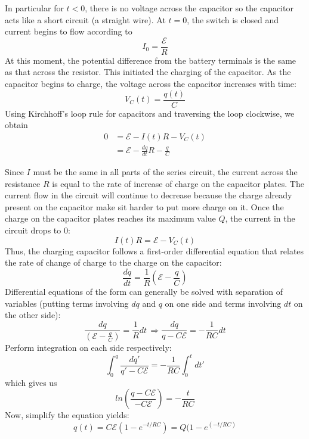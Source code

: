 \documentclass[11pt, letterpaper]{article}
\begin{document}
In particular for $t < 0$, there is no voltage across the capacitor so the capacitor acts like a short circuit (a straight wire). At $t = 0$, the switch is closed and current begins to flow according to \[I_0 = \frac{\mathcal{E}}{R}\] At this moment, the potential difference from the battery terminals is the same as that across the resistor. This initiated the charging of the capacitor. As the capacitor begins to charge, the voltage across the capacitor increases with time: \[V_C(t) = \frac{q(t)}{C}\] Using Kirchhoff's loop rule for capacitors and traversing the loop clockwise, we obtain
\begin{align*}
	0  & = \mathcal{E} - I(t)R - V_C(t)\\
		& = \mathcal{E} - \frac{dq}{dt}R - \frac{q}{C}
\end{align*}

Since $I$ must be the same in all parts of the series circuit, the current across the resistance $R$ is equal to the rate of increase of charge on the capacitor plates. The current flow in the circuit will continue to decrease because the charge already present on the capacitor make sit harder to put more charge on it. Once the charge on the capacitor plates reaches its maximum value $Q$, the current in the circuit drops to $0$: \[I(t)R = \mathcal{E} - V_C(t)\] Thus, the charging capacitor follows a first-order differential equation that relates the rate of change of charge to the charge on the capacitor: \[\frac{dq}{dt} = \frac{1}{R}\left(\mathcal{E} - \frac{q}{C}\right)\] Differential equations of the form can generally be solved with separation of variables (putting terms involving $dq$ and $q$ on one side and terms involving $dt$ on the other side): \[\frac{dq}{\left(\mathcal{E} - \frac{q}{C}\right)} = \frac{1}{R}dt \,\Rightarrow \frac{dq}{q - C\mathcal{E}} = -\frac{1}{RC}dt\] Perform integration on each side respectively: \[\int_0^q\frac{dq'}{q'-C\mathcal{E}} = -\frac{1}{RC}\int_0^tdt'\] which gives us \[ln\left(\frac{q - C\mathcal{E}}{-C\mathcal{E}}\right) = -\frac{t}{RC}\] Now, simplify the equation yields:
\begin{equation}\label{eqn:charging}
	\boxed{q(t) = C\mathcal{E}\left(1 - e^{-t/RC}\right) = Q(1 - e^{(-t/RC)}}
\end{equation}
\end{document}
